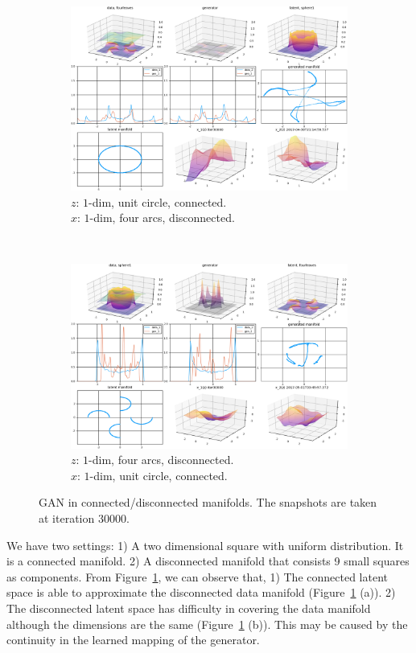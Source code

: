 \begin{figure}[ht]
\begin{subfigure}[t]{0.45\textwidth}
        \includegraphics[width=\linewidth]{"fig/sphere1_fourleaves_00030000"}
        \caption{$z$: $1$-dim, unit circle, connected.\\
            $x$: $1$-dim, four arcs, disconnected.}
    \end{subfigure}
    ~
    \begin{subfigure}[t]{0.45\textwidth}
        \includegraphics[width=\linewidth]{"fig/fourleaves_sphere1_00030000"}
        \caption{$z$: $1$-dim, four arcs, disconnected.\\
            $x$: $1$-dim, unit circle, connected.}
    \end{subfigure}
    \caption{\small
        GAN in connected/disconnected manifolds.
        The snapshots are taken at iteration $30000$.
        }
    \label{fig:conn}
\end{figure}

We have two settings:
1) A two dimensional square with uniform distribution.
It is a connected manifold.
2) A disconnected manifold that consists 9 small squares as components.
From Figure~\ref{fig:conn},
we can observe that,
1) The connected latent space is able to approximate the disconnected
data manifold (Figure~\ref{fig:conn} (a)).
2) The disconnected latent space has difficulty in covering
the data manifold although the dimensions are the same
(Figure~\ref{fig:conn} (b)).
This may be caused by the continuity in the learned mapping
of the generator.
